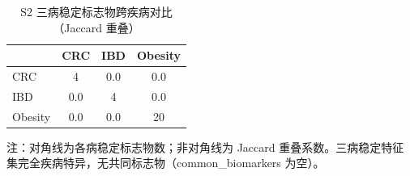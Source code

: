 \begin{table}[htbp]
\centering
\caption{S2 三病稳定标志物跨疾病对比（Jaccard 重叠）}
\label{tab:s2-cross-disease}
\small
\begin{tabular}{lccc}
\toprule
 & CRC & IBD & Obesity \\
\midrule
CRC & 4 & 0.0 & 0.0 \\
IBD & 0.0 & 4 & 0.0 \\
Obesity & 0.0 & 0.0 & 20 \\
\bottomrule
\end{tabular}
\par\footnotesize
注：对角线为各病稳定标志物数；非对角线为 Jaccard 重叠系数。三病稳定特征集完全疾病特异，无共同标志物（common\_biomarkers 为空）。
\end{table}
